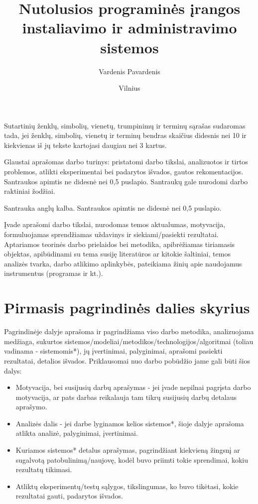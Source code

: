 \documentclass[fleqn]{VUMIFKompMagistrinis}
\title{Nutolusios programinės įrangos instaliavimo ir administravimo sistemos}
\author{Vardenis Pavardenis}
\date{Vilnius \\ \the\year}
\begin{document}
\maketitle

\tableofcontents

Sutartinių ženklų, simbolių, vienetų, trumpinimų ir terminų sąrašas sudaromas
tada, jei ženklų, simbolių, vienetų ir terminų bendras skaičius didesnis nei 10
ir kiekvienas iš jų tekste kartojasi daugiau nei 3 kartus. 

Glaustai aprašomas darbo turinys: pristatomi darbo tikslai, analizuotos ir
tirtos problemos, atlikti eksperimentai bei padarytos išvados, gautos
rekomentacijos. Santraukos apimtis ne didesnė nei 0,5 puslapio. Santraukų gale
nurodomi darbo raktiniai žodžiai. 

Santrauka anglų kalba. Santraukos apimtis ne didesnė nei 0,5 puslapio.


Įvade aprašomi darbo tikslai, nurodomas temos aktualumas, motyvacija,
formuluojamas sprendžiamas uždavinys ir siekiami/pasiekti rezultatai.
Aptariamos teorinės darbo prielaidos bei metodika, apibrėžiamas tiriamasis
objektas, apibūdinami su tema susiję literatūros ar kitokie šaltiniai, temos
analizės tvarka, darbo atlikimo aplinkybės, pateikiama žinių apie naudojamus
instrumentus (programas ir kt.).

\section{Pirmasis pagrindinės dalies skyrius}
Pagrindinėje dalyje aprašoma ir pagrindžiama viso darbo metodika, analizuojama
medžiaga, sukurtos sistemos/modeliai/metodikos/technologijos/algoritmai (toliau
vadinama - sistemomis*), jų įvertinimai, palyginimai, aprašomi pasiekti
rezultatai, detalios išvados. Priklausomai nuo darbo pobūdžio jame gali būti
šios dalys:
\begin{itemize}
    \item Motyvacija, bei susijusių darbų aprašymas - jei įvade nepilnai
        pagrįsta darbo motyvacija, ar pats darbas reikalauja tam tikrų
        susijusių darbų detalaus aprašymo.
    \item Analizės dalis - jei darbe lyginamos kelios sistemos*, šioje dalyje
        aprašoma atlikta analizė, palyginimai, įvertinimai.
    \item Kuriamos sistemos* detalus aprašymas, pagrindžiant kiekvieną žingsnį
        ar sugalvotą patobulinimą/naujovę, kodėl buvo priimti tokie sprendimai,
        kokiu rezultatų tikimasi.
    \item Atliktų eksperimentų/testų sąlygos, tikslingumas, ko buvo tikėtasi,
        kokie rezultatai gauti, padarytos išvados.
\end{itemize}
\end{document}
